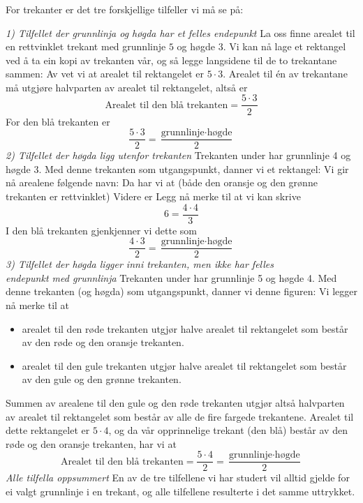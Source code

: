 \subsubsection{\artri \label{artri}}
For trekanter er det tre forskjellige tilfeller vi må se på: \vsk

\textit{1) Tilfellet der grunnlinja og høgda har et felles endepunkt} \os
La oss finne arealet til en rettvinklet trekant med grunnlinje $ 5 $ og høgde $ 3 $.
Vi kan nå lage et rektangel ved å ta ein kopi av trekanten vår, og så legge langsidene til de to trekantane sammen:
Av  vet vi at arealet til rektangelet er $ {5\cdot 3} $. Arealet til én av trekantane må utgjøre halvparten av arealet til rektangelet, altså er
\[ \text{Arealet til den blå trekanten} = \frac{5\cdot 3}{2} \]
For den blå trekanten er 
\[\frac{5\cdot3}{2}= \frac{\text{grunnlinje}\cdot\text{høgde}}{2} \]
\newpage
\textit{2) Tilfellet der høgda ligg utenfor trekanten} \os
Trekanten under har grunnlinje 4 og høgde 3. 
Med denne trekanten som utgangspunkt, danner vi et rektangel:
Vi gir nå arealene følgende navn:
Da har vi at (både den oransje og den grønne trekanten er rettvinklet)
Videre er
Legg nå merke til at vi kan skrive
\[ 6=\frac{4\cdot4}{3} \]
I den blå trekanten gjenkjenner vi dette som 
\[ \frac{4\cdot3}{2}=\frac{\text{grunnlinje}\cdot\text{høgde}}{2} \]
\newpage
\textit{3) Tilfellet der høgda ligger inni trekanten, men ikke har felles\\ endepunkt med grunnlinja} \os
Trekanten under har grunnlinje 5 og høgde 4.
Med denne trekanten (og høgda) som utgangspunkt, danner vi denne figuren:
Vi legger nå merke til at
\begin{itemize}
	\item arealet til den røde trekanten utgjør halve arealet til rektangelet som består av den røde og den oransje trekanten.
	\item arealet til den gule trekanten utgjør halve arealet til rektangelet som består av den gule og den grønne trekanten.
\end{itemize}
Summen av arealene til den gule og den røde trekanten utgjør altså halvparten av arealet til rektangelet som består av alle de fire fargede trekantene. Arealet til dette rektangelet er $ 5\cdot4 $, og da vår opprinnelige trekant (den blå) består av den røde og den oransje trekanten, har vi at
\[ \text{Arealet til den blå trekanten}=\frac{5\cdot4}{2}=\frac{\text{grunnlinje}\cdot\text{høgde}}{2} \] 
\newpage
\textit{Alle tilfella oppsummert}\os
En av de tre tilfellene vi har studert vil alltid  gjelde for ei valgt grunnlinje i en trekant, og alle tilfellene resulterte i det samme uttrykket.\regv

